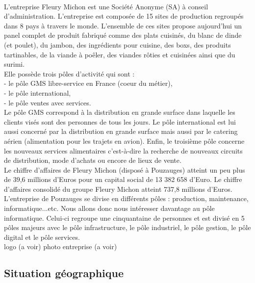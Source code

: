 \documentclass[a4paper,12pt]{extarticle}
\begin{document}
		\paragraph{}

	L’entreprise Fleury Michon est une Société Anonyme (SA) à conseil d'administration. L’entreprise est composée de 15 sites de production regroupés dans 8 pays à travers le monde. L’ensemble de ces sites propose aujourd’hui un panel complet de produit fabriqué comme des plats cuisinés, du blanc de dinde (et poulet), du jambon, des ingrédients pour cuisine, des boxs, des produits tartinables, de la viande à poêler, des viandes rôties et cuisinées ainsi que du surimi.\\
Elle possède trois pôles d’activité qui sont :\\
	 - le pôle GMS libre-service en France (coeur du métier),\\
	- le pôle international,\\
	- le pôle ventes avec services.\\
Le pôle GMS correspond à la distribution en grande surface dans laquelle les clients visés sont des personnes de tous les jours. Le pôle international est lui aussi concerné par la distribution en grande surface mais aussi par le catering aérien (alimentation pour les trajets en avion). Enfin, le troisième pôle concerne les nouveaux services alimentaires c’est-à-dire la recherche de nouveaux circuits de distribution, mode d’achats ou encore de lieux de vente.\\
Le chiffre d’affaires de Fleury Michon (disposé à Pouzauges) atteint un peu plus de 39,6 millions d’Euros pour un capital social de 13 382 658 d’Euro. Le chiffre d’affaires consolidé du groupe Fleury Michon atteint 737,8 millions d’Euros.\\
L’entreprise de Pouzauges se divise en différents pôles : production, maintenance, informatique...etc.
Nous allons donc nous intéresser davantage au pôle informatique. Celui-ci regroupe une cinquantaine de personnes et est divisé en 5 pôles majeurs avec le pôle infrastructure, le pôle industriel, le pôle gestion, le pôle digital et le pôle services.\\

logo (a voir)
photo entreprise (a voir)

	\subsection{Situation géographique}
		\paragraph{}
\end{document}
